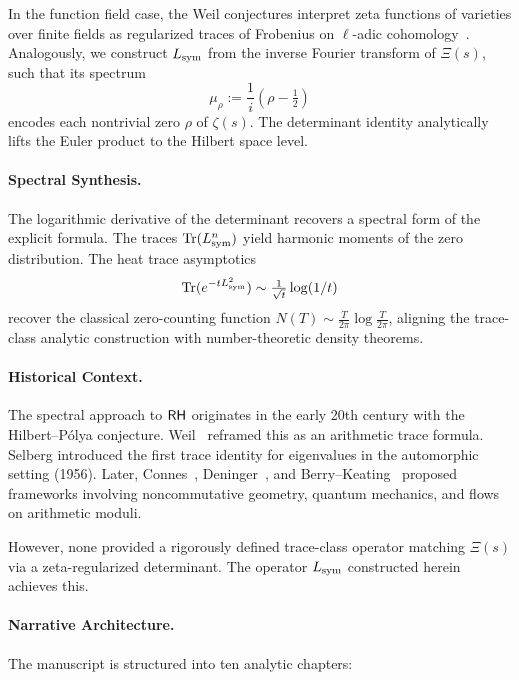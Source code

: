 In the function field case, the Weil conjectures interpret zeta functions of varieties over finite fields as regularized traces of Frobenius on \(\ell\)-adic cohomology~\cite{Deligne1971WeilI}. Analogously, we construct \( L_{\mathrm{sym}} \) from the inverse Fourier transform of \( \Xi(s) \), such that its spectrum
\[
\mu_\rho := \frac{1}{i}(\rho - \tfrac{1}{2})
\]
encodes each nontrivial zero \( \rho \) of \( \zeta(s) \). The determinant identity analytically lifts the Euler product to the Hilbert space level.

\paragraph*{Spectral Synthesis.}
The logarithmic derivative of the determinant recovers a spectral form of the explicit formula. The traces \( \operatorname{Tr}(L_{\mathrm{sym}}^n) \) yield harmonic moments of the zero distribution. The heat trace asymptotics
\[
\operatorname{Tr}(e^{-t L_{\mathrm{sym}}^2}) \sim \tfrac{1}{\sqrt{t}} \log(1/t)
\]
recover the classical zero-counting function \( N(T) \sim \tfrac{T}{2\pi} \log \tfrac{T}{2\pi} \), aligning the trace-class analytic construction with number-theoretic density theorems.

\paragraph*{Historical Context.}
The spectral approach to \(\mathsf{RH}\) originates in the early 20th century with the Hilbert--Pólya conjecture. Weil~\cite{Weil1952Explicite} reframed this as an arithmetic trace formula. Selberg introduced the first trace identity for eigenvalues in the automorphic setting (1956). Later, Connes~\cite{Connes1999TraceFormula}, Deninger~\cite{Deninger1998Frobenius}, and Berry--Keating~\cite{Berry1986RiemannSpectra} proposed frameworks involving noncommutative geometry, quantum mechanics, and flows on arithmetic moduli.

However, none provided a rigorously defined trace-class operator matching \( \Xi(s) \) via a zeta-regularized determinant. The operator \( L_{\mathrm{sym}} \) constructed herein achieves this.

\paragraph*{Narrative Architecture.}
The manuscript is structured into ten analytic chapters:

